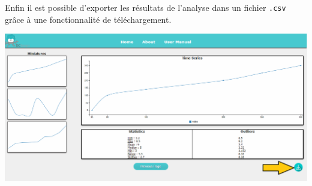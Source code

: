 		Enfin il est possible d'exporter les résultats de l'analyse dans un fichier \lstinline!.csv! grâce à une fonctionnalité de téléchargement.\\
			\begin{center}\includegraphics[scale=0.40]{fenetre3Download.png}\end{center}

